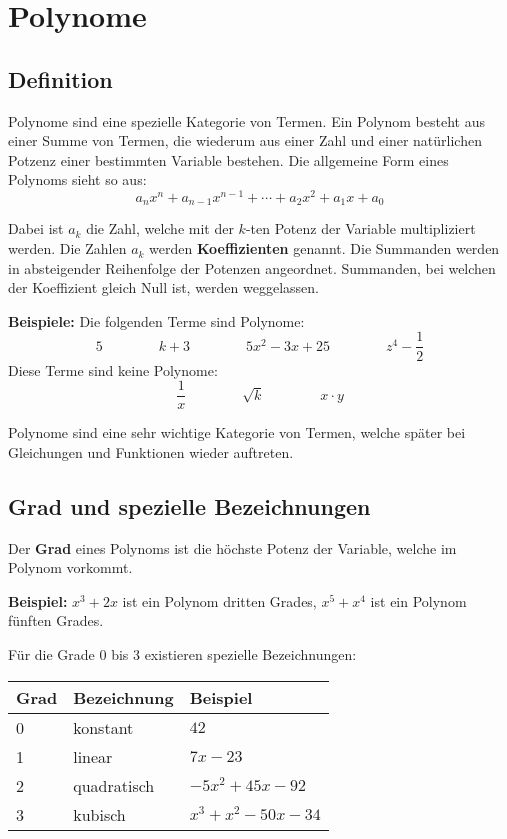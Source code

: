 \newpage
\section{Polynome}

\subsection{Definition}

Polynome sind eine spezielle Kategorie von Termen. Ein Polynom besteht aus einer Summe von Termen, die wiederum aus einer Zahl und einer natürlichen Potzenz einer bestimmten Variable bestehen. Die allgemeine Form eines Polynoms sieht so aus:
\[
  a_{n}x^{n} + a_{n-1}x^{n-1} + \cdots + a_{2}x^{2} + a_{1}x + a_{0}
\]

Dabei ist $a_{k}$ die Zahl, welche mit der $k$-ten Potenz der Variable multipliziert werden. Die Zahlen $a_{k}$ werden \textbf{Koeffizienten} genannt. Die Summanden werden in absteigender Reihenfolge der Potenzen angeordnet. Summanden, bei welchen der Koeffizient gleich Null ist, werden weggelassen.

\begin{example}
  \textbf{Beispiele:} Die folgenden Terme sind Polynome:
  \[
    5 \qquad\qquad k+3 \qquad\qquad 5x^{2}-3x+25 \qquad\qquad z^{4}-\frac{1}{2}
  \]
  Diese Terme sind keine Polynome:
  \[
    \frac{1}{x} \qquad\qquad \sqrt{k} \qquad\qquad x\cdot y
  \]
\end{example}

Polynome sind eine sehr wichtige Kategorie von Termen, welche später bei Gleichungen und Funktionen wieder auftreten.

\subsection{Grad und spezielle Bezeichnungen}

Der \textbf{Grad} eines Polynoms ist die höchste Potenz der Variable, welche im Polynom vorkommt.

\begin{example}
  \textbf{Beispiel:} $x^{3}+2x$ ist ein Polynom dritten Grades, $x^{5}+x^{4}$ ist ein Polynom fünften Grades.
\end{example}

Für die Grade 0 bis 3 existieren spezielle Bezeichnungen:
\begin{center}
  \def\arraystretch{1.1}
  \begin{tabularx}{0.9\textwidth}{XXR}
  \toprule
    \textbf{Grad} & \textbf{Bezeichnung} & \textbf{Beispiel} \\
   & konstant & $42$ \\
   & linear & $7x-23$ \\
   & quadratisch & $-5x^{2}+45x-92$ \\
   & kubisch & $x^{3}+x^{2}-50x-34$ \\
  \bottomrule
  \end{tabularx}
\end{center}

